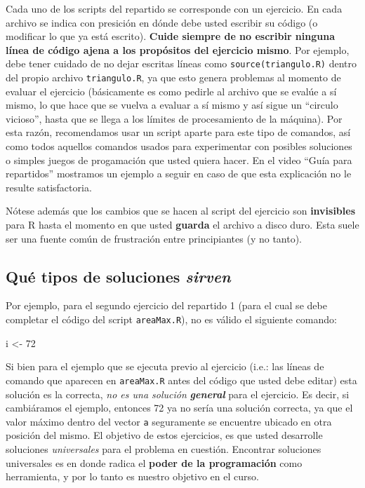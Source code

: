 \documentclass[]{article}
\newenvironment{Shaded}{}{}
\newcommand{\DecValTok}[1]{\textcolor[rgb]{0.25,0.63,0.44}{{#1}}}
\newcommand{\NormalTok}[1]{{#1}}
\begin{document}
Cada uno de los scripts del repartido se corresponde con un ejercicio.
En cada archivo se indica con presición en dónde debe usted escribir su
código (o modificar lo que ya está escrito). \textbf{Cuide siempre de no
escribir ninguna línea de código ajena a los propósitos del ejercicio
mismo}. Por ejemplo, debe tener cuidado de no dejar escritas líneas como
\texttt{source(triangulo.R)} dentro del propio archivo
\texttt{triangulo.R}, ya que esto genera problemas al momento de evaluar
el ejercicio (básicamente es como pedirle al archivo que se evalúe a sí
mismo, lo que hace que se vuelva a evaluar a sí mismo y así sigue un
``circulo vicioso'', hasta que se llega a los límites de procesamiento
de la máquina). Por esta razón, recomendamos usar un script aparte para
este tipo de comandos, así como todos aquellos comandos usados para
experimentar con posibles soluciones o simples juegos de progamación que
usted quiera hacer. En el video ``Guía para repartidos'' mostramos un
ejemplo a seguir en caso de que esta explicación no le resulte
satisfactoria.

Nótese además que los cambios que se hacen al script del ejercicio son
\textbf{invisibles} para R hasta el momento en que usted \textbf{guarda}
el archivo a disco duro. Esta suele ser una fuente común de frustración
entre principiantes (y no tanto).

\subsection{Qué tipos de soluciones \emph{sirven}}

Por ejemplo, para el segundo ejercicio del repartido 1 (para el cual se
debe completar el código del script \texttt{areaMax.R}), no es válido el
siguiente comando:

\begin{Shaded}
\begin{Highlighting}[]
\NormalTok{i <- }\DecValTok{72}
\end{Highlighting}
\end{Shaded}
Si bien para el ejemplo que se ejecuta previo al ejercicio (i.e.: las
líneas de comando que aparecen en \texttt{areaMax.R} antes del código
que usted debe editar) esta solución es la correcta, \emph{no es una
solución} \emph{\textbf{general}} para el ejercicio. Es decir, si
cambiáramos el ejemplo, entonces 72 ya no sería una solución correcta,
ya que el valor máximo dentro del vector \texttt{a} seguramente se
encuentre ubicado en otra posición del mismo. El objetivo de estos
ejercicios, es que usted desarrolle soluciones \emph{universales} para
el problema en cuestión. Encontrar soluciones universales es en donde
radica el \textbf{poder de la programación} como herramienta, y por lo
tanto es nuestro objetivo en el curso.
\end{document}
